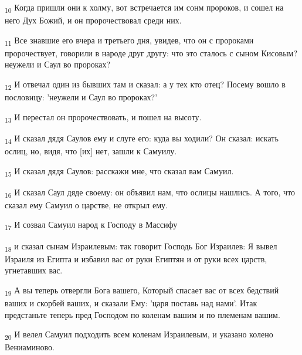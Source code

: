 \begin{tcolorbox}
\textsubscript{10} Когда пришли они к холму, вот встречается им сонм пророков, и сошел на него Дух Божий, и он пророчествовал среди них.
\end{tcolorbox}
\begin{tcolorbox}
\textsubscript{11} Все знавшие его вчера и третьего дня, увидев, что он с пророками пророчествует, говорили в народе друг другу: что это сталось с сыном Кисовым? неужели и Саул во пророках?
\end{tcolorbox}
\begin{tcolorbox}
\textsubscript{12} И отвечал один из бывших там и сказал: а у тех кто отец? Посему вошло в пословицу: 'неужели и Саул во пророках?'
\end{tcolorbox}
\begin{tcolorbox}
\textsubscript{13} И перестал он пророчествовать, и пошел на высоту.
\end{tcolorbox}
\begin{tcolorbox}
\textsubscript{14} И сказал дядя Саулов ему и слуге его: куда вы ходили? Он сказал: искать ослиц, но, видя, что [их] нет, зашли к Самуилу.
\end{tcolorbox}
\begin{tcolorbox}
\textsubscript{15} И сказал дядя Саулов: расскажи мне, что сказал вам Самуил.
\end{tcolorbox}
\begin{tcolorbox}
\textsubscript{16} И сказал Саул дяде своему: он объявил нам, что ослицы нашлись. А того, что сказал ему Самуил о царстве, не открыл ему.
\end{tcolorbox}
\begin{tcolorbox}
\textsubscript{17} И созвал Самуил народ к Господу в Массифу
\end{tcolorbox}
\begin{tcolorbox}
\textsubscript{18} и сказал сынам Израилевым: так говорит Господь Бог Израилев: Я вывел Израиля из Египта и избавил вас от руки Египтян и от руки всех царств, угнетавших вас.
\end{tcolorbox}
\begin{tcolorbox}
\textsubscript{19} А вы теперь отвергли Бога вашего, Который спасает вас от всех бедствий ваших и скорбей ваших, и сказали Ему: 'царя поставь над нами'. Итак предстаньте теперь пред Господом по коленам вашим и по племенам вашим.
\end{tcolorbox}
\begin{tcolorbox}
\textsubscript{20} И велел Самуил подходить всем коленам Израилевым, и указано колено Вениаминово.
\end{tcolorbox}
